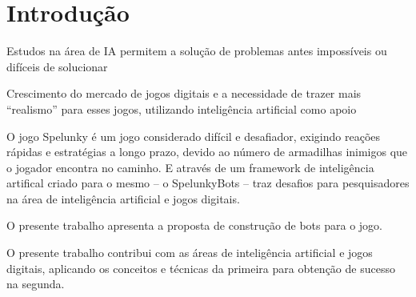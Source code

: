 \chapter{\label{chap:intro}Introdução}

\begin{listing}
    \item Estudos na área de IA permitem a solução de problemas antes
        impossíveis ou difíceis de solucionar
    \item Crescimento do mercado de jogos digitais e a necessidade de trazer
        mais ``realismo'' para esses jogos, utilizando inteligência artificial
        como apoio
    \item O jogo Spelunky é um jogo considerado difícil e desafiador, exigindo
        reações rápidas e estratégias a longo prazo, devido ao número de
        armadilhas inimigos que o jogador encontra no caminho. E através de um 
        framework de inteligência artifical criado para o mesmo -- o
        SpelunkyBots -- traz desafios para pesquisadores na área de inteligência
        artificial e jogos digitais.
    \item O presente trabalho apresenta a proposta de construção de bots para o
        jogo.
    \item O presente trabalho contribui com as áreas de inteligência artificial
        e jogos digitais, aplicando os conceitos e técnicas da primeira para
        obtenção de sucesso na segunda.
\end{listing}
